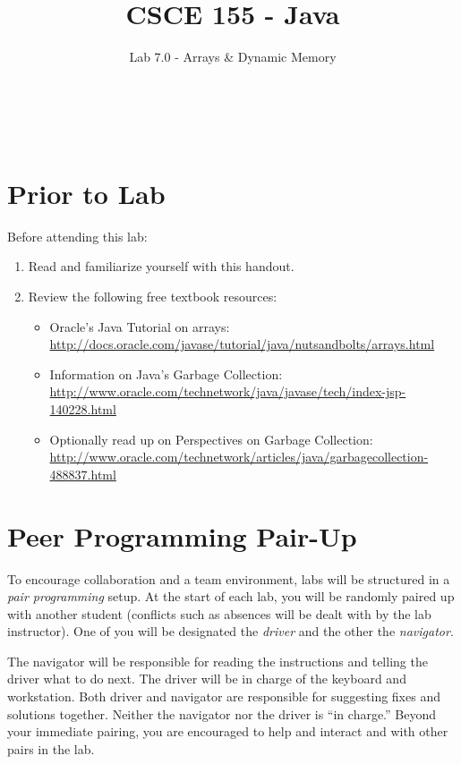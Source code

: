 \documentclass[12pt]{scrartcl}
\title{CSCE 155 - Java}
\subtitle{Lab 7.0 - Arrays \& Dynamic Memory}
\author{~}
\date{~}
\begin{document}
\maketitle

\section*{Prior to Lab}

Before attending this lab:
\begin{enumerate}
  \item Read and familiarize yourself with this handout.
  \item Review the following free textbook resources:
	\begin{itemize}
  	  \item Oracle's Java Tutorial on arrays:\\
		\url{http://docs.oracle.com/javase/tutorial/java/nutsandbolts/arrays.html}
	  \item Information on Java's Garbage Collection:\\
		\url{http://www.oracle.com/technetwork/java/javase/tech/index-jsp-140228.html}
	  \item Optionally read up on Perspectives on Garbage Collection: 
		\url{http://www.oracle.com/technetwork/articles/java/garbagecollection-488837.html}
	\end{itemize}
\end{enumerate}

\section*{Peer Programming Pair-Up}

To encourage collaboration and a team environment, labs will be
structured in a \emph{pair programming} setup.  At the start of
each lab, you will be randomly paired up with another student 
(conflicts such as absences will be dealt with by the lab instructor).
One of you will be designated the \emph{driver} and the other
the \emph{navigator}.  

The navigator will be responsible for reading the instructions and
telling the driver what to do next.  The driver will be in charge of the
keyboard and workstation.  Both driver and navigator are responsible
for suggesting fixes and solutions together.  Neither the navigator
nor the driver is ``in charge.''  Beyond your immediate pairing, you
are encouraged to help and interact and with other pairs in the lab.
\end{document}
